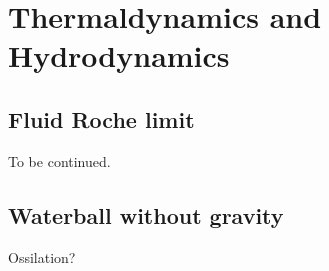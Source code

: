 
\section{\label{sec:Thermal}Thermaldynamics and Hydrodynamics}

\subsection{\label{sec:Roche}Fluid Roche limit}

	To be continued.

\subsection{\label{sec:Waterball}Waterball without gravity}

	Ossilation?